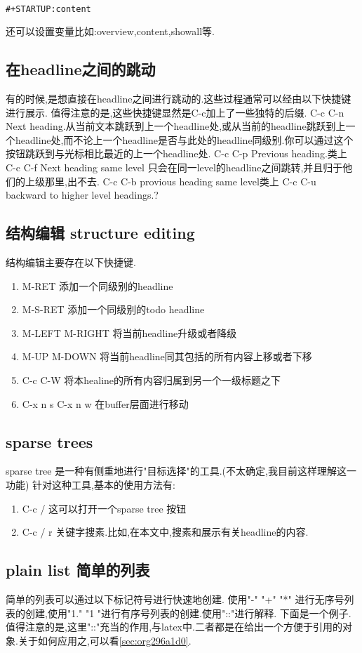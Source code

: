 \documentclass[10pt,a4paper]{article}
\begin{document}
\begin{verbatim}

#+STARTUP:content

\end{verbatim}
还可以设置变量比如:overview,content,showall等.
\subsection{在headline之间的跳动}
\label{sec:org41fdbe3}
有的时候,是想直接在headline之间进行跳动的.这些过程通常可以经由以下快捷键进行展示.
值得注意的是,这些快捷键显然是C-c加上了一些独特的后缀.
C-c C-n Next heading.从当前文本跳跃到上一个headline处,或从当前的headline跳跃到上一个headline处,而不论上一个headline是否与此处的headline同级别.你可以通过这个按钮跳跃到与光标相比最近的上一个headline处.
C-c C-p Previous heading.类上
C-c C-f Next heading same level 只会在同一level的headline之间跳转,并且归于他们的上级那里,出不去.
C-c C-b provious heading same level类上
C-c C-u backward to higher level headings.?
\subsection{结构编辑 structure editing}
\label{sec:org3b00968}
结构编辑主要存在以下快捷键.
\begin{enumerate}
\item M-RET 添加一个同级别的headline
\item M-S-RET 添加一个同级别的todo headline
\item M-LEFT M-RIGHT 将当前headline升级或者降级
\item M-UP M-DOWN 将当前headline同其包括的所有内容上移或者下移
\item C-c C-W 将本healine的所有内容归属到另一个一级标题之下
\item C-x n s C-x n w 在buffer层面进行移动
\end{enumerate}
\subsection{sparse trees}
\label{sec:org9159014}
   sparse tree 是一种有侧重地进行"目标选择"的工具.(不太确定,我目前这样理解这一功能)
针对这种工具,基本的使用方法有:
\begin{enumerate}
\item C-c / 这可以打开一个sparse tree 按钮
\item C-c / r 关键字搜素.比如,在本文中,搜素和展示有关headline的内容.
\end{enumerate}

\subsection{plain list 简单的列表}
\label{sec:orgdb78b68}
简单的列表可以通过以下标记符号进行快速地创建.
使用"-" "+" "*" 进行无序号列表的创建,使用"1." "1 "进行有序号列表的创建.使用"::"进行解释.
下面是一个例子.值得注意的是,这里"::"充当的作用,与latex中.二者都是在给出一个方便于引用的对象.关于如何应用之,可以看\ref{sec:org296a1d0}.
\end{document}
